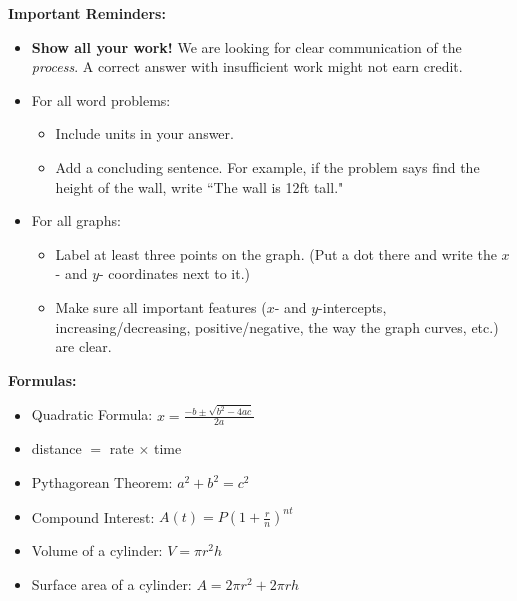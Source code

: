 {\bf Important Reminders:}
\begin{itemize}
	\item {\bf Show all your work!}  We are looking for clear communication of the \emph{process}.  A correct answer with insufficient work might not earn credit.

	\item For all word problems:
		\begin{itemize}
			\item Include units in your answer.
			\item Add a concluding sentence. For example, if the problem says find the height of the wall, write ``The wall is 12ft tall."
		\end{itemize}
	\item For all graphs:
		\begin{itemize}
			\item Label at least three points on the graph.  (Put a dot there and write the $x$- and $y$- coordinates next to it.)
			\item Make sure all important features ($x$- and $y$-intercepts, increasing/decreasing, positive/negative, the way the graph curves, etc.) are  clear.  
		\end{itemize}
	\end{itemize}
	
	
{\bf Formulas:}
\begin{itemize}
    \item Quadratic Formula: $\displaystyle x = \frac{-b \pm \sqrt{b^2 - 4ac}}{2a}$
    \item distance $=$ rate $\times$ time
    \item Pythagorean Theorem: $\displaystyle a^2 + b^2 = c^2$
    \item Compound Interest: $\displaystyle A(t) = P\left ( 1 + \frac rn \right )^{nt}$
    \item Volume of a cylinder: $\displaystyle V = \pi r^2 h$
    \item Surface area of a cylinder: $\displaystyle A = 2\pi r^2 + 2\pi r h$
\end{itemize}
	
	
\vfill
\eject 
